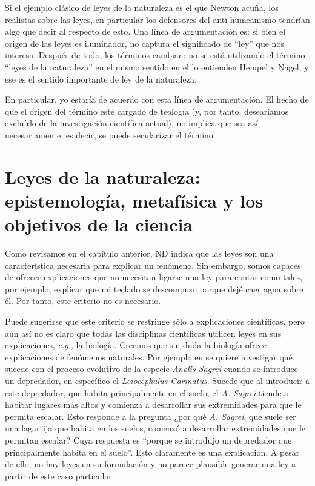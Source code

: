 Si el ejemplo clásico de leyes de la naturaleza es el que Newton acuña, los realistas sobre las leyes, en particular los defensores del anti-humeanismo tendrían algo que decir al respecto de esto. Una línea de argumentación es: si bien el origen de las leyes es iluminador, no captura el significado de ``ley'' que nos interesa. Después de todo, los términos cambian: no se está utilizando el término ``leyes de la naturaleza'' en el mismo sentido en el lo entienden Hempel y Nagel, y ese es el sentido importante de ley de la naturaleza.

En particular, yo estaría de acuerdo con esta línea de argumentación. El hecho de que el origen del término esté cargado de teología (y, por tanto, desearíamos excluírlo de la investigación científica actual), no implica que sea así necesariamente, es decir, se puede secularizar el término.

\section{Leyes de la naturaleza: epistemología, metafísica y los objetivos de la ciencia}

Como revisamos en el capítulo anterior, ND indica que las leyes son una característica necesaria para explicar un fenómeno. Sin embargo, somos capaces de ofrecer explicaciones que no necesitan ligarse una ley para contar como tales, por ejemplo, explicar que mi teclado se descompuso porque dejé caer agua sobre él. Por tanto, este criterio no es necesario.

Puede sugerirse que este criterio se restringe sólo a explicaciones científicas, pero aún así no es claro que todas las disciplinas científicas utilicen leyes en sus explicaciones, \textit{e.g.}, la biología. Creemos que sin duda la biología ofrece explicaciones de fenómenos naturales. Por ejemplo en \cite{Losos2004} se quiere investigar qué sucede con el proceso evolutivo de la especie \textit{Anolis Sagrei} cuando se introduce un depredador, en específico el \textit{Leiocephalus Carinatus}. Sucede que al introducir a este depredador, que habita principalmente en el suelo, el \textit{A. Sagrei} tiende a habitar lugares más altos y comienza a desarrollar sus extremidades para que le permita escalar. Esto responde a la pregunta ¿por qué \textit{A. Sagrei}, que suele ser una lagartija que habita en los suelos, comenzó a desarrollar extremidades que le permitan escalar? Cuya respuesta es ``porque se introdujo un depredador que principalmente habita en el suelo''. Esto claramente es una explicación. A pesar de ello, no hay leyes en su formulación y no parece plausible generar una ley a partir de este caso particular.

